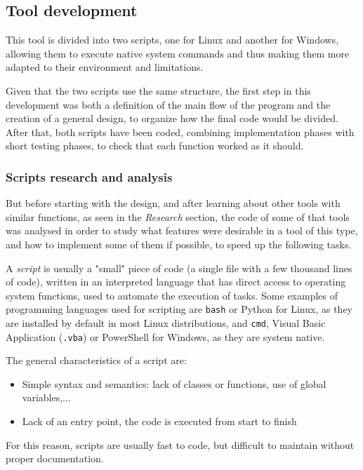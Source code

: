 \subsection{Tool development}
\label{ssec:toolDev}
This tool is divided into two scripts, one for Linux and another for Windows, allowing them to execute native system commands and thus making them more adapted to their environment and limitations. 

Given that the two scripts use the same structure, the first step in this development was both a definition of the main flow of the program and the creation of a general design, to organize how the final code would be divided. After that, both scripts have been coded, combining implementation phases with short testing phases, to check that each function worked as it should. 

\subsubsection{Scripts research and analysis}
But before starting with the design, and after learning about other tools with similar functions, as seen in the \textit{Research} section, the code of some of that tools was analysed in order to study what features were desirable in a tool of this type, and how to implement some of them if possible, to speed up the following tasks.

A \textit{script} is usually a "small" piece of code (a single file with a few thousand lines of code), written in an interpreted language that has direct access to operating system functions, used to automate the execution of tasks\cite{WikiScript}. Some examples of programming languages used for scripting are \texttt{bash} or Python for Linux, as they are installed by default in most Linux distributions, and \texttt{cmd}, Visual Basic Application (\texttt{.vba}) or PowerShell for Windows, as they are system native.

The general characteristics of a script are:
\begin{itemize}
\item Simple syntax and semantics: lack of classes or functions, use of global variables,...
\item Lack of an entry point, the code is executed from start to finish
\end{itemize}

For this reason, scripts are usually fast to code, but difficult to maintain without proper documentation.


